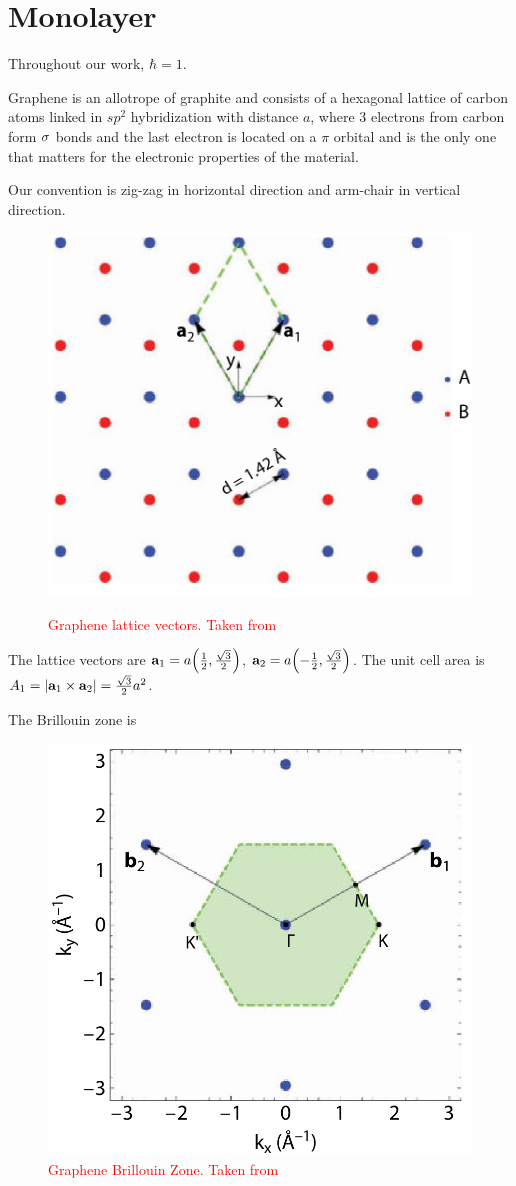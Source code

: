 \documentclass[a4paper,12pt]{report}
\begin{document}
\section{Monolayer}

Throughout our work, $\hbar = 1$.

\n

Graphene is an allotrope of graphite and consists of a hexagonal lattice of carbon atoms linked in $sp^2$ hybridization with distance $a$, where $3$ electrons from carbon form $\sigma$ bonds and the last electron is located on a $\pi$ orbital and is the only one that matters for the electronic properties of the material.

\n

Our convention is zig-zag in horizontal direction and arm-chair in vertical direction.

\begin{figure}[H]
\centering
\includegraphics[width=0.4\linewidth]{fig/graphene-lattice_vectors2.png}
\label{fig:graphene-lattice_vectors}
\caption{\textcolor{red}{Graphene lattice vectors. Taken from \cite{handbook2019}}}
\end{figure}

The lattice vectors are $\vb{a}_1 = a \qty(\frac{1}{2}, \frac{\sqrt{3}}{2})$, $\vb{a}_2 = a \qty(-\frac{1}{2}, \frac{\sqrt{3}}{2})$. The unit cell area is $ A_1 = \abs{{\vb{a}}_1 \times {\vb{a}}_2} = \frac{\sqrt{3}}{2} a^2 $.

The Brillouin zone is
\begin{figure}[H]
\centering
\includegraphics[width=0.3\linewidth]{fig/brillouin-zone-monolayer.png}
\caption{\textcolor{red}{Graphene Brillouin Zone. Taken from \cite{handbook2019}}}
\label{fig:brillouin-zone-monolayer}
\end{figure}
\end{document}
